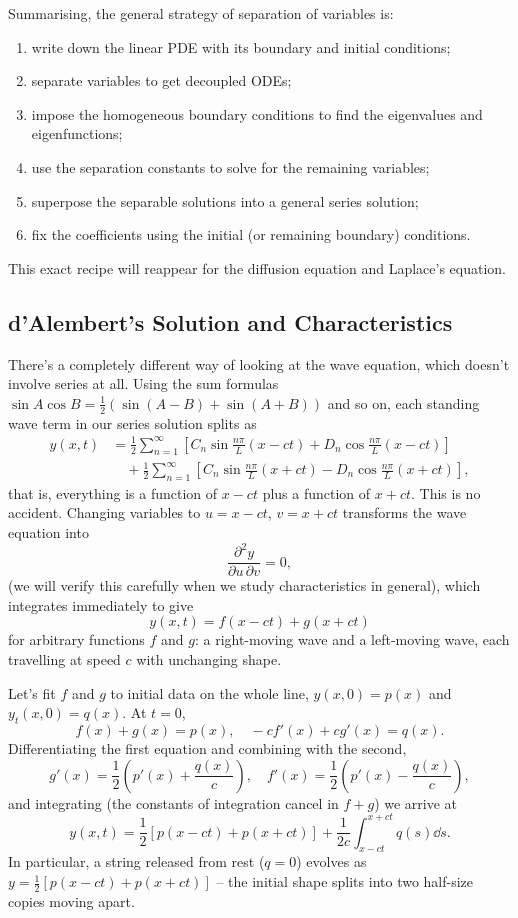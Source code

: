Summarising, the general strategy of separation of variables is:
\begin{enumerate}
    \item write down the linear PDE with its boundary and initial conditions;
    \item separate variables to get decoupled ODEs;
    \item impose the homogeneous boundary conditions to find the eigenvalues and eigenfunctions;
    \item use the separation constants to solve for the remaining variables;
    \item superpose the separable solutions into a general series solution;
    \item fix the coefficients using the initial (or remaining boundary) conditions.
\end{enumerate}
This exact recipe will reappear for the diffusion equation and Laplace's equation.

\subsection{d'Alembert's Solution and Characteristics}

There's a completely different way of looking at the wave equation, which doesn't involve series at all. Using the sum formulas $\sin A \cos B = \frac{1}{2}(\sin(A - B) + \sin(A + B))$ and so on, each standing wave term in our series solution splits as
\begin{align*}
    y(x, t) &= \frac{1}{2}\sum_{n = 1}^{\infty} \left[C_n \sin \frac{n \pi}{L}(x - ct) + D_n \cos \frac{n \pi}{L}(x - ct)\right] \\
    &\quad + \frac{1}{2}\sum_{n = 1}^{\infty} \left[C_n \sin \frac{n \pi}{L}(x + ct) - D_n \cos \frac{n \pi}{L}(x + ct)\right],
\end{align*}
that is, everything is a function of $x - ct$ plus a function of $x + ct$. This is no accident. Changing variables to $u = x - ct$, $v = x + ct$ transforms the wave equation into
$$
\frac{\partial^2 y}{\partial u \, \partial v} = 0,
$$
(we will verify this carefully when we study characteristics in general), which integrates immediately to give
$$
y(x, t) = f(x - ct) + g(x + ct)
$$
for arbitrary functions $f$ and $g$: a right-moving wave and a left-moving wave, each travelling at speed $c$ with unchanging shape.

Let's fit $f$ and $g$ to initial data on the whole line, $y(x, 0) = p(x)$ and $y_t(x, 0) = q(x)$. At $t = 0$,
$$
f(x) + g(x) = p(x), \quad -c f'(x) + c g'(x) = q(x).
$$
Differentiating the first equation and combining with the second,
$$
g'(x) = \frac{1}{2}\left(p'(x) + \frac{q(x)}{c}\right), \quad f'(x) = \frac{1}{2}\left(p'(x) - \frac{q(x)}{c}\right),
$$
and integrating (the constants of integration cancel in $f + g$) we arrive at 
$$
y(x, t) = \frac{1}{2}\left[p(x - ct) + p(x + ct)\right] + \frac{1}{2c} \int_{x - ct}^{x + ct} q(s) \dd s.
$$
In particular, a string released from rest ($q = 0$) evolves as $y = \frac{1}{2}[p(x - ct) + p(x + ct)]$ -- the initial shape splits into two half-size copies moving apart.

